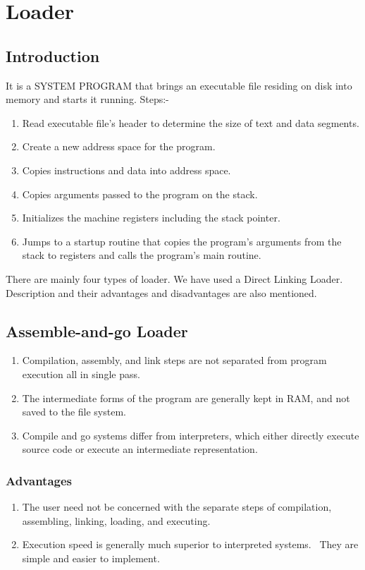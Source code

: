 \documentclass{scrreprt}
\begin{document}
\chapter{Loader}
\section{Introduction}
It is a SYSTEM PROGRAM that brings an executable file
residing on disk into memory and starts it running.
Steps:-
\begin{enumerate}
\item Read executable file’s header to determine the size of
text and data segments.
\item Create a new address space for the program.
\item Copies instructions and data into address space.
\item Copies arguments passed to the program on the stack.
\item Initializes the machine registers including the stack pointer.
\item Jumps to a startup routine that copies the program’s
arguments from the stack to registers and calls the
program’s main routine.
\end{enumerate}

There are mainly four types of loader. We have used a Direct Linking Loader.
Description and their advantages and disadvantages are also mentioned.
\section{Assemble-and-go Loader}

\begin{enumerate}
\item Compilation, assembly, and link steps are not separated
from program execution all in single pass.
\item The intermediate forms of the program are generally kept
in RAM, and not saved to the file system.
\item Compile and go systems differ from interpreters, which
either directly execute source code or execute an
intermediate representation.
\end{enumerate}

\subsection{Advantages}
\begin{enumerate}
\item The user need not be concerned with the separate steps
of compilation, assembling, linking, loading, and
executing.
\item Execution speed is generally much superior to interpreted
systems.
\ They are simple and easier to implement.
\end{enumerate}
\end{document}
